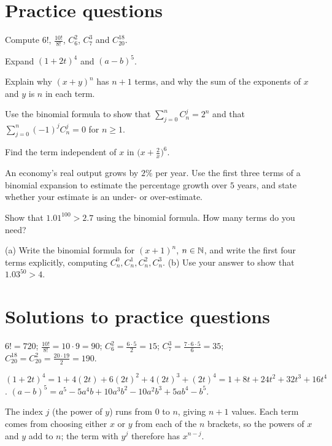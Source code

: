 \section{Practice questions}
\pq[basic] Compute $6!$, $\frac{10!}{8!}$, $C_6^2$, $C_7^3$ and $C_{20}^{18}$.

\pq[basic] Expand $(1+2t)^4$ and $(a-b)^5$.

\pq[conceptual] Explain why $(x+y)^n$ has $n+1$ terms, and why the sum of the exponents of $x$ and $y$ is $n$ in each term.

\pq[mathematical] Use the binomial formula to show that $\sum_{j=0}^{n}C_n^j=2^n$ and that $\sum_{j=0}^{n}(-1)^jC_n^j=0$ for
$n\ge1$.

\pq[mathematical] Find the term independent of $x$ in $\big(x+\frac2x\big)^6$.

\pq[application] An economy's real output grows by $2\%$ per year. Use the first three terms of a binomial expansion to
estimate the percentage growth over $5$ years, and state whether your estimate is an under- or over-estimate.

 Show that $1.01^{100}>2.7$ using the binomial formula. How many terms do you need?

 (a) Write the binomial formula for $(x+1)^n$, $n\in\mathbb{N}$, and write the first four terms explicitly, computing
$C_n^0,C_n^1,C_n^2,C_n^3$. (b) Use your answer to show that $1.03^{50}>4$.

\section{Solutions to practice questions}
$6!=720$; $\frac{10!}{8!}=10\cdot9=90$; $C_6^2=\frac{6\cdot5}2=15$; $C_7^3=\frac{7\cdot6\cdot5}{6}=35$;
$C_{20}^{18}=C_{20}^2=\frac{20\cdot19}{2}=190$.

$(1+2t)^4=1+4(2t)+6(2t)^2+4(2t)^3+(2t)^4=1+8t+24t^2+32t^3+16t^4$.
$(a-b)^5=a^5-5a^4b+10a^3b^2-10a^2b^3+5ab^4-b^5$.

The index $j$ (the power of $y$) runs from $0$ to $n$, giving $n+1$ values. Each term comes from choosing either $x$ or
$y$ from each of the $n$ brackets, so the powers of $x$ and $y$ add to $n$; the term with $y^j$ therefore has $x^{n-j}$.

